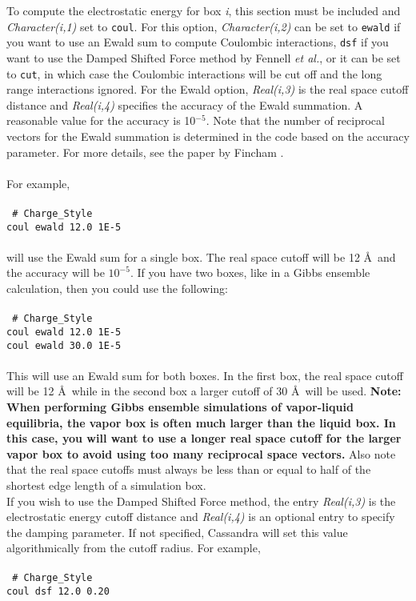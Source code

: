 To compute the electrostatic energy for box {\em i}, 
this section must be included and {\it Character(i,1)} set to \texttt{coul}.
For this option,
{\it Character(i,2)} can be set to \texttt{ewald} if you want to use
an Ewald sum to compute Coulombic interactions, \texttt{dsf} if you want to use
the Damped Shifted Force method by Fennell \textit{et al.}\cite{Fennell:2006}, or it can be set to
\texttt{cut}, in which case the Coulombic interactions will be cut off and
the long range interactions ignored. For the Ewald option, 
{\it Real(i,3)} is the real space cutoff distance and {\it Real(i,4)}
specifies the accuracy of the Ewald summation. A reasonable value for
the accuracy is 10$^{-5}$. Note that the number of reciprocal vectors
for the Ewald summation is determined in the code based on the
accuracy parameter. For more details, see the paper by Fincham
\cite{Fincham:1994}.\\ \\ 
%
For example,
\\ \\
\texttt{
\# Charge\_Style \\
coul ewald 12.0 1E-5}\\ \\
will use the Ewald sum for a single box. The real space cutoff will be
12 \AA\ and the accuracy will be $10^{-5}$. If you have two boxes,
like in a Gibbs ensemble calculation, then you could use the
following:
\\ \\
\texttt{
\# Charge\_Style \\
coul ewald 12.0 1E-5\\
coul ewald 30.0 1E-5}
\\ \\ 
This will use an Ewald sum for both boxes. In the first box, the real
space cutoff will be 12 \AA\ while in the second box a larger cutoff
of 30 \AA\ will be used. {\bf Note: When performing Gibbs ensemble
simulations of vapor-liquid equilibria, the vapor box is often much
larger than the liquid box. In this case, you will want to use a
longer real space cutoff for the larger vapor box to avoid using too
many reciprocal space vectors.} Also note that the real space
cutoffs must always be less than or equal to half of the shortest edge
length of a simulation box. \\ 

If you wish to use the Damped Shifted Force method, the entry {\it Real(i,3)}
is the electrostatic energy cutoff distance and {\it Real(i,4)} is an optional
entry to specify the damping parameter. If not specified, Cassandra will
set this value algorithmically from the cutoff radius. For example, 
\\ \\
\texttt{
\# Charge\_Style \\
coul dsf 12.0 0.20}\\ 

